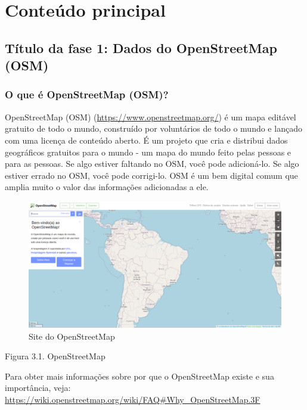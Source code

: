 \documentclass[
]{book}
\begin{document}
\hypertarget{conteuxfado-principal-3}{%
\section{Conteúdo principal}\label{conteuxfado-principal-3}}

\hypertarget{tuxedtulo-da-fase-1-dados-do-openstreetmap-osm}{%
\subsection{Título da fase 1: Dados do OpenStreetMap (OSM)}\label{tuxedtulo-da-fase-1-dados-do-openstreetmap-osm}}

\hypertarget{o-que-uxe9-openstreetmap-osm}{%
\subsubsection{\texorpdfstring{\textbf{O que é OpenStreetMap (OSM)?}}{O que é OpenStreetMap (OSM)?}}\label{o-que-uxe9-openstreetmap-osm}}

OpenStreetMap (OSM) (\url{https://www.openstreetmap.org/}) é um mapa editável gratuito de todo o mundo, construído por voluntários de todo o mundo e lançado com uma licença de conteúdo aberto. É um projeto que cria e distribui dados geográficos gratuitos para o mundo - um mapa do mundo feito pelas pessoas e para as pessoas. Se algo estiver faltando no OSM, você pode adicioná-lo. Se algo estiver errado no OSM, você pode corrigi-lo. OSM é um bem digital comum que amplia muito o valor das informações adicionadas a ele.

\begin{figure}
\centering
\includegraphics{media/modulo3/osm.png}
\caption{Site do OpenStreetMap}
\end{figure}

Figura 3.1. OpenStreetMap

Para obter mais informações sobre por que o OpenStreetMap existe e sua importância, veja: \href{https://wiki.openstreetmap.org/wiki/FAQ\#Why_OpenStreetMap\%20.3F}{https://wiki.openstreetmap.org/wiki/FAQ\#Why\_OpenStreetMap.3F}
\end{document}
